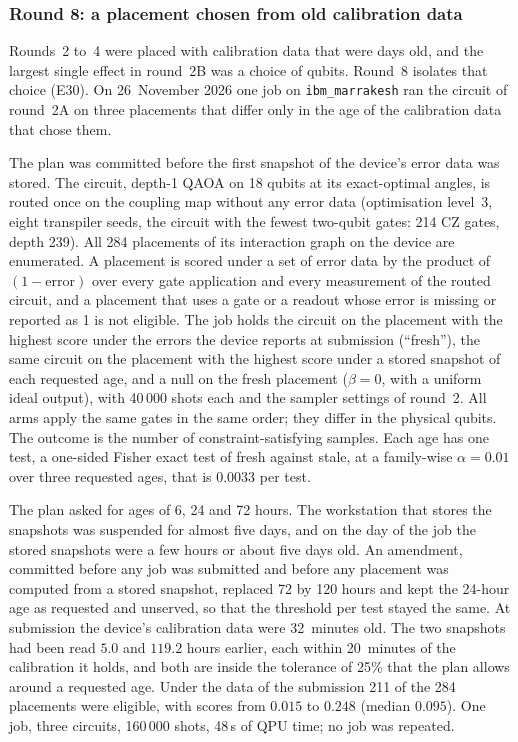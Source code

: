 \documentclass[11pt,a4paper]{article}
\begin{document}
\subsubsection{Round 8: a placement chosen from old calibration data}
\label{sec:res-hw8}

Rounds~2 to~4 were placed with calibration data that were days old, and
the largest single effect in round~2B was a choice of qubits. Round~8
isolates that choice (E30). On 26~November 2026 one job on
\texttt{ibm\_marrakesh} ran the circuit of round~2A on three placements
that differ only in the age of the calibration data that chose them.

The plan was committed before the first snapshot of the device's error
data was stored. The circuit, depth-1 QAOA on 18 qubits at its
exact-optimal angles, is routed once on the coupling map without any error
data (optimisation level~3, eight transpiler seeds, the circuit with the
fewest two-qubit gates: 214 CZ gates, depth 239). All 284 placements of its
interaction graph on the device are enumerated. A placement is scored under
a set of error data by the product of $(1 - \text{error})$ over every gate
application and every measurement of the routed circuit, and a placement
that uses a gate or a readout whose error is missing or reported as 1 is
not eligible. The
job holds the circuit on the placement with the highest score under the
errors the device reports at submission (``fresh''), the same circuit on
the placement with the highest score under a stored snapshot of each
requested age, and a null on the fresh placement ($\beta = 0$, with a
uniform ideal output), with 40\,000 shots each and the sampler settings of
round~2. All arms apply the same gates in the same order; they differ in
the physical qubits. The outcome is the number of constraint-satisfying
samples. Each age has one test, a one-sided Fisher exact test of fresh
against stale, at a family-wise $\alpha = 0.01$ over three requested ages,
that is $0.0033$ per test.

The plan asked for ages of 6, 24 and 72 hours. The workstation that stores
the snapshots was suspended for almost five days, and on the day of the job
the stored snapshots were a few hours or about five days old. An amendment, committed
before any job was submitted and before any placement was computed from a
stored snapshot, replaced 72 by 120 hours and kept the 24-hour age as
requested and unserved, so that the threshold per test stayed the same. At
submission the device's calibration data were 32~minutes old. The two
snapshots had been read $5.0$ and $119.2$ hours earlier, each within
20~minutes of the calibration it holds, and both are inside the tolerance
of 25\% that the plan allows around a requested age. Under the data of the
submission 211 of the 284 placements were eligible, with scores from
$0.015$ to $0.248$ (median $0.095$). One job, three circuits, 160\,000
shots, 48\,s of QPU time; no job was repeated.
\end{document}
